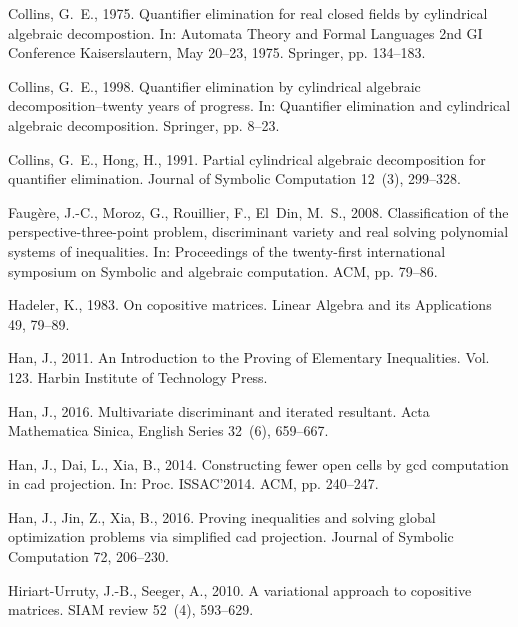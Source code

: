 \documentclass[amsthm]{elsart}
\begin{document}
\begin{thebibliography}{32}
Collins, G.~E., 1975. Quantifier elimination for real closed fields by
  cylindrical algebraic decompostion. In: Automata Theory and Formal Languages
  2nd GI Conference Kaiserslautern, May 20--23, 1975. Springer, pp. 134--183.

Collins, G.~E., 1998. Quantifier elimination by cylindrical algebraic
  decomposition--twenty years of progress. In: Quantifier elimination and
  cylindrical algebraic decomposition. Springer, pp. 8--23.

Collins, G.~E., Hong, H., 1991. Partial cylindrical algebraic decomposition for
  quantifier elimination. Journal of Symbolic Computation 12~(3), 299--328.

Faug{\`e}re, J.-C., Moroz, G., Rouillier, F., El~Din, M.~S., 2008.
  Classification of the perspective-three-point problem, discriminant variety
  and real solving polynomial systems of inequalities. In: Proceedings of the
  twenty-first international symposium on Symbolic and algebraic computation.
  ACM, pp. 79--86.

Hadeler, K., 1983. On copositive matrices. Linear Algebra and its Applications
  49, 79--89.

Han, J., 2011. An Introduction to the Proving of Elementary Inequalities. Vol.
  123. Harbin Institute of Technology Press.

Han, J., 2016. Multivariate discriminant and iterated resultant. Acta
  Mathematica Sinica, English Series 32~(6), 659--667.

Han, J., Dai, L., Xia, B., 2014. Constructing fewer open cells by gcd
  computation in cad projection. In: Proc. ISSAC'2014. ACM, pp. 240--247.

Han, J., Jin, Z., Xia, B., 2016. Proving inequalities and solving global
  optimization problems via simplified cad projection. Journal of Symbolic
  Computation 72, 206--230.

Hiriart-Urruty, J.-B., Seeger, A., 2010. A variational approach to copositive
  matrices. SIAM review 52~(4), 593--629.


\end{thebibliography}
\end{document}

